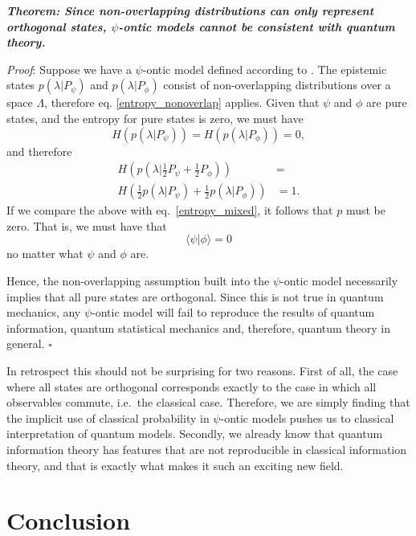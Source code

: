 \documentclass[10pt,twocolumn, nofootinbib]{revtex4-2}
\begin{document}
\emph{\textbf{Theorem: Since non-overlapping distributions can only represent orthogonal states, $\psi$-ontic models cannot be consistent with quantum theory.}}

\emph{Proof}: Suppose we have a $\psi$-ontic model defined according to \cite{Harrigan:2010}. The epistemic states $p(\lambda|P_\psi)$ and $p(\lambda|P_\phi)$ consist of non-overlapping distributions over a space $\Lambda$, therefore eq. \ref{entropy_nonoverlap} applies. Given that $\psi$ and $\phi$ are pure states, and the entropy for pure states is zero, we must have
\begin{equation}\label{entropy_pure}
	H(p(\lambda|P_\psi)) = H(p(\lambda|P_\phi)) = 0,
\end{equation}
and therefore
\begin{equation}\label{required_entropy}
	\begin{aligned}
	H\left(p(\lambda|\frac{1}{2}P_\psi + \frac{1}{2}P_\phi)\right) &= \\
H\left(\frac{1}{2}p(\lambda|P_\psi) + \frac{1}{2}p(\lambda|P_\phi)\right) 
&= 1.
	\end{aligned}
\end{equation}
If we compare the above with eq.~\ref{entropy_mixed}, it follows that $p$ must be zero. That is, we must have that
\begin{equation}\label{orthogonal}
	 \langle \psi | \phi \rangle = 0
\end{equation}
no matter what $\psi$ and $\phi$ are.

Hence, the non-overlapping assumption built into the $\psi$-ontic model necessarily implies that all pure states are orthogonal. Since this is not true in quantum mechanics, any $\psi$-ontic model will fail to reproduce the results of quantum information, quantum statistical mechanics and, therefore, quantum theory in general. $\square$

In retrospect this should not be surprising for two reasons. First of all, the case where all states are orthogonal corresponds exactly to the case in which all observables commute, i.e.~the classical case. Therefore, we are simply finding that the implicit use of classical probability in $\psi$-ontic models pushes us to classical interpretation of quantum models. Secondly, we already know that quantum information theory has features that are not reproducible in classical information theory, and that is exactly what makes it such an exciting new field.


\section{Conclusion}
\end{document}
